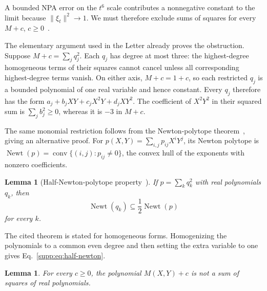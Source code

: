 \documentclass[aps,prl,onecolumn,10pt,superscriptaddress,nofootinbib,longbibliography]{revtex4-2}
\newtheorem{lemma}[theorem]{Lemma}
\theoremstyle{remark}
\newcommand{\Newt}{\operatorname{Newt}}
\begin{document}
A bounded NPA error on the $t^6$ scale contributes a nonnegative constant to the limit because $\|\xi_t\|^2\to1$. We must therefore exclude sums of squares for every $M+c$, $c\geq0$~\cite{Hilbert1888,Motzkin1967}.

The elementary argument used in the Letter already proves the obstruction. Suppose $M+c=\sum_jq_j^2$. Each $q_j$ has degree at most three: the highest-degree homogeneous terms of their squares cannot cancel unless all corresponding highest-degree terms vanish. On either axis, $M+c=1+c$, so each restricted $q_j$ is a bounded polynomial of one real variable and hence constant. Every $q_j$ therefore has the form $a_j+b_jXY+c_jX^2Y+d_jXY^2$. The coefficient of $X^2Y^2$ in their squared sum is $\sum_jb_j^2\geq0$, whereas it is $-3$ in $M+c$.

The same monomial restriction follows from the Newton-polytope theorem~\cite[Theorem~1]{Reznick1978}, giving an alternative proof. For $p(X,Y)=\sum_{i,j}p_{ij}X^iY^j$, its Newton polytope is $\Newt(p)=\operatorname{conv}\{(i,j):p_{ij}\neq0\}$, the convex hull of the exponents with nonzero coefficients.

\begin{lemma}[Half-Newton-polytope property~\cite{Reznick1978}]
\label{supp:lem:half-newton}
If $p=\sum_kq_k^2$ with real polynomials $q_k$, then
\begin{equation}
\Newt(q_k)\subseteq\frac12\Newt(p)
\label{supp:eq:half-newton}
\end{equation}
for every $k$.
\end{lemma}

The cited theorem is stated for homogeneous forms. Homogenizing the polynomials to a common even degree and then setting the extra variable to one gives Eq.~\eqref{supp:eq:half-newton}.

\begin{lemma}
\label{supp:lem:motzkin-not-sos}
For every $c\geq0$, the polynomial $M(X,Y)+c$ is not a sum of squares of real polynomials.
\end{lemma}
\end{document}
